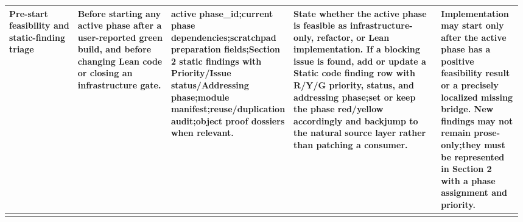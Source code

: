 \begin{longtable}{L{0.14\linewidth} L{0.19\linewidth} L{0.18\linewidth} L{0.31\linewidth} L{0.16\linewidth}}
Pre-start feasibility and static-finding triage & Before starting any active phase after a user-reported green build, and before changing Lean code or closing an infrastructure gate. & active phase\_id;\newline current phase dependencies;\newline scratchpad preparation fields;\newline Section 2 static findings with Priority/\allowbreak{}Issue status/\allowbreak{}Addressing phase;\newline module manifest;\newline reuse/\allowbreak{}duplication audit;\newline object proof dossiers when relevant. & State whether the active phase is feasible as infrastructure-only, refactor, or Lean implementation. If a blocking issue is found, add or update a Static code finding row with R/\allowbreak{}Y/\allowbreak{}G priority, status, and addressing phase;\newline set or keep the phase red/\allowbreak{}yellow accordingly and backjump to the natural source layer rather than patching a consumer. & Implementation may start only after the active phase has a positive feasibility result or a precisely localized missing bridge. New findings may not remain prose-only;\newline they must be represented in Section 2 with a phase assignment and priority.\\
\hline
\addlinespace[0.24em]

\end{longtable}
